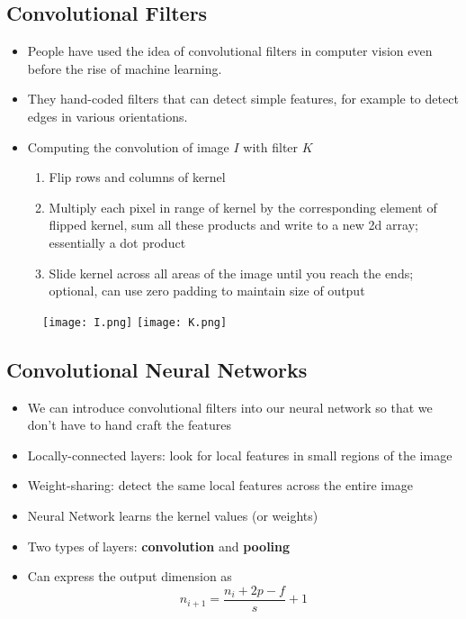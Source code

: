 \documentclass[11pt]{article}
\begin{document}
\subsection{Convolutional Filters}
\begin{itemize}
\item People have used the idea of convolutional filters in computer vision even before the rise of machine learning.
\item They hand-coded filters that can detect simple features, for example to detect edges in various orientations.
\item Computing the convolution of image $I$ with filter $K$
\begin{enumerate}
\item Flip rows and columns of kernel
\item Multiply each pixel in range of kernel by the corresponding element of flipped kernel, sum all these products and write to a new 2d array; essentially a dot product 
\item Slide kernel across all areas of the image until you reach the ends; optional,  can use zero padding to maintain size of output
\end{enumerate}
\end{itemize}
\begin{figure}[H]
\begin{center}
\subfigure
{\texttt{[image: I.png]}}
\subfigure
{\texttt{[image: K.png]}}
\end{center}
\end{figure}

\subsection{Convolutional Neural Networks}
\begin{itemize}
\item We can introduce convolutional filters into our neural network so that we don’t have to hand craft the features
\item Locally-connected layers: look for local features in small regions of the image
\item Weight-sharing: detect the same local features across the entire image
\item Neural Network learns the kernel values (or weights)
\item Two types of layers: \textbf{convolution} and \textbf{pooling}
\item Can express the output dimension as 
$$ n_{i+1} = \frac{n_i + 2p-f}{s} + 1 $$
\end{itemize}
\end{document}
